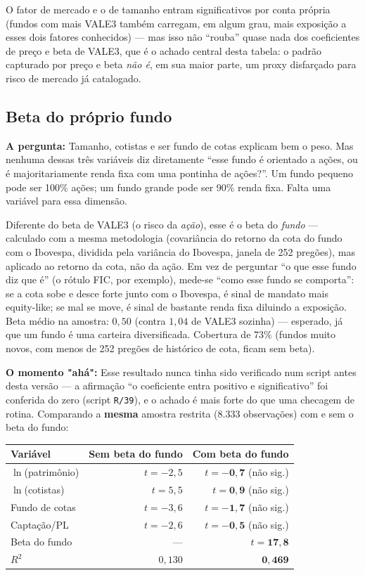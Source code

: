 \documentclass[11pt,a4paper]{article}
\newcommand{\pergunta}[1]{\par\vspace{4pt}\noindent\textbf{\color{azul}A pergunta:} #1\par\vspace{2pt}}
\newcommand{\aha}[1]{\par\vspace{4pt}\noindent\textbf{\color{vermelho}O momento "ahá":} #1\par\vspace{2pt}}
\begin{document}
O fator de mercado e o de tamanho entram significativos por conta própria (fundos com mais VALE3
também carregam, em algum grau, mais exposição a esses dois fatores conhecidos) --- mas isso não
``rouba'' quase nada dos coeficientes de preço e beta de VALE3, que é o achado central desta
tabela: o padrão capturado por preço e beta \emph{não é}, em sua maior parte, um proxy disfarçado
para risco de mercado já catalogado.

\subsection{Beta do próprio fundo}

\pergunta{Tamanho, cotistas e ser fundo de cotas explicam bem o peso. Mas nenhuma dessas três
variáveis diz diretamente ``esse fundo é orientado a ações, ou é majoritariamente renda fixa com
uma pontinha de ações?''. Um fundo pequeno pode ser 100\% ações; um fundo grande pode ser 90\%
renda fixa. Falta uma variável para essa dimensão.}

Diferente do beta de VALE3 (o risco da \emph{ação}), esse é o beta do \emph{fundo} --- calculado
com a mesma metodologia (covariância do retorno da cota do fundo com o Ibovespa, dividida pela
variância do Ibovespa, janela de 252 pregões), mas aplicado ao retorno da cota, não da ação. Em
vez de perguntar ``o que esse fundo diz que é'' (o rótulo FIC, por exemplo), mede-se ``como esse
fundo se comporta'': se a cota sobe e desce forte junto com o Ibovespa, é sinal de mandato mais
equity-like; se mal se move, é sinal de bastante renda fixa diluindo a exposição. Beta médio na
amostra: $0{,}50$ (contra $1{,}04$ de VALE3 sozinha) --- esperado, já que um fundo é uma carteira
diversificada. Cobertura de $73\%$ (fundos muito novos, com menos de 252 pregões de histórico de
cota, ficam sem beta).

\aha{Esse resultado nunca tinha sido verificado num script antes desta versão --- a afirmação
``o coeficiente entra positivo e significativo'' foi conferida do zero (script \texttt{R/39}), e
o achado é mais forte do que uma checagem de rotina. Comparando a \textbf{mesma} amostra
restrita ($8.333$ observações) com e sem o beta do fundo:}

\begin{center}\small
\begin{tabular}{@{}lrr@{}}
\toprule
Variável & Sem beta do fundo & Com beta do fundo \\
\midrule
$\ln$(patrimônio) & $t=-2{,}5$ & $t=\mathbf{-0{,}7}$ (não sig.) \\
$\ln$(cotistas)   & $t=5{,}5$  & $t=\mathbf{0{,}9}$ (não sig.) \\
Fundo de cotas     & $t=-3{,}6$ & $t=\mathbf{-1{,}7}$ (não sig.) \\
Captação/PL       & $t=-2{,}6$ & $t=\mathbf{-0{,}5}$ (não sig.) \\
Beta do fundo     & --- & $t=\mathbf{17{,}8}$ \\
\midrule
$R^2$ & $0{,}130$ & $\mathbf{0{,}469}$ \\
\bottomrule
\end{tabular}
\end{center}
\end{document}
